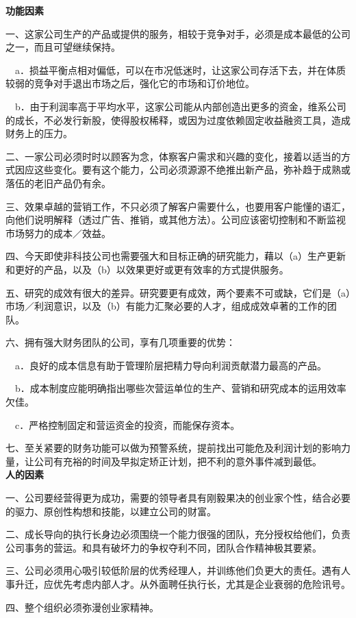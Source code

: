 \documentclass[UTF8,a4paper,zihao=-4,fontset = windows]{ctexart} %
\begin{document}
\textbf{功能因素}


一、这家公司生产的产品或提供的服务，相较于竞争对手，必须是成本最低的公司之一，而且可望继续保持。

　a．损益平衡点相对偏低，可以在市况低迷时，让这家公司存活下去，并在体质较弱的竞争对手退出市场之后，强化它的市场和订价地位。

　b．由于利润率高于平均水平，这家公司能从内部创造出更多的资金，维系公司的成长，不必发行新股，使得股权稀释，或因为过度依赖固定收益融资工具，造成财务上的压力。

二、一家公司必须时时以顾客为念，体察客户需求和兴趣的变化，接着以适当的方式因应这些变化。要有这个能力，公司必须源源不绝推出新产品，弥补趋于成熟或落伍的老旧产品仍有余。

三、效果卓越的营销工作，不只必须了解客户需要什么，也要用客户能懂的语汇，向他们说明解释（透过广告、推销，或其他方法）。公司应该密切控制和不断监视市场努力的成本／效益。

四、今天即使非科技公司也需要强大和目标正确的研究能力，藉以（a）生产更新和更好的产品，以及（b）以效果更好或更有效率的方式提供服务。

五、研究的成效有很大的差异。研究要更有成效，两个要素不可或缺，它们是（a）市场／利润意识，以及（b）有能力汇聚必要的人才，组成成效卓著的工作的团队。

六、拥有强大财务团队的公司，享有几项重要的优势：

　a．良好的成本信息有助于管理阶层把精力导向利润贡献潜力最高的产品。

　b．成本制度应能明确指出哪些次营运单位的生产、营销和研究成本的运用效率欠佳。

　c．严格控制固定和营运资金的投资，而能保存资本。

七、至关紧要的财务功能可以做为预警系统，提前找出可能危及利润计划的影响力量，让公司有充裕的时间及早拟定矫正计划，把不利的意外事件减到最低。
\\

\textbf{人的因素}


一、公司要经营得更为成功，需要的领导者具有刚毅果决的创业家个性，结合必要的驱力、原创性构想和技能，以建立公司的财富。

二、成长导向的执行长身边必须围绕一个能力很强的团队，充分授权给他们，负责公司事务的营运。和具有破坏力的争权夺利不同，团队合作精神极其要紧。

三、公司必须用心吸引较低阶层的优秀经理人，并训练他们负更大的责任。遇有人事升迁，应优先考虑内部人才。从外面聘任执行长，尤其是企业衰弱的危险讯号。

四、整个组织必须弥漫创业家精神。
\end{document}

